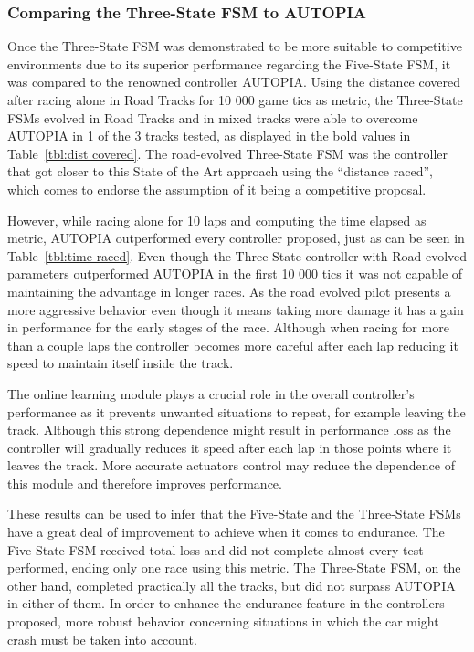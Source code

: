 \subsubsection{Comparing the Three-State FSM to AUTOPIA} \label{subsubsec:CompAUTOPIA}

	Once the Three-State FSM was demonstrated to be more suitable to competitive environments due to its superior performance regarding the Five-State FSM, it was compared to the renowned controller AUTOPIA. Using the distance covered after racing alone in Road Tracks for 10 000 game tics as metric, the Three-State FSMs evolved in Road Tracks and in mixed tracks were able to overcome AUTOPIA in 1 of the 3 tracks tested, as displayed in the bold values in Table~\ref{tbl:dist covered}. The road-evolved Three-State FSM was the controller that got closer to this State of the Art approach using the ``distance raced'', which comes to endorse the assumption of it being a competitive proposal.
	
	However, while racing alone for 10 laps and computing the time elapsed as metric, AUTOPIA outperformed every controller proposed, just as can be seen in Table~\ref{tbl:time raced}. Even though the Three-State controller with Road evolved parameters outperformed AUTOPIA in the first 10 000 tics it was not capable of maintaining the advantage in longer races. As the road evolved pilot presents a more aggressive behavior even though it means taking more damage it has a gain in performance for the early stages of the race. Although when racing for more than a couple laps the controller becomes more careful after each lap reducing it speed to maintain itself inside the track.
	
	The online learning module plays a crucial role in the overall controller's performance as it prevents unwanted situations to repeat, for example leaving the track. Although this strong dependence might result in performance loss as the controller will gradually reduces it speed after each lap in those points where it leaves the track. More accurate actuators control may reduce the dependence of this module and therefore improves performance.
	
	These results can be used to infer that the Five-State and the Three-State FSMs have a great deal of improvement to achieve when it comes to endurance. The Five-State FSM received total loss and did not complete almost every test performed, ending only one race using this metric. The Three-State FSM, on the other hand, completed practically all the tracks, but did not surpass AUTOPIA in either of them. In order to enhance the endurance feature in the controllers proposed, more robust behavior concerning situations in which the car might crash must be taken into account.	
	
	